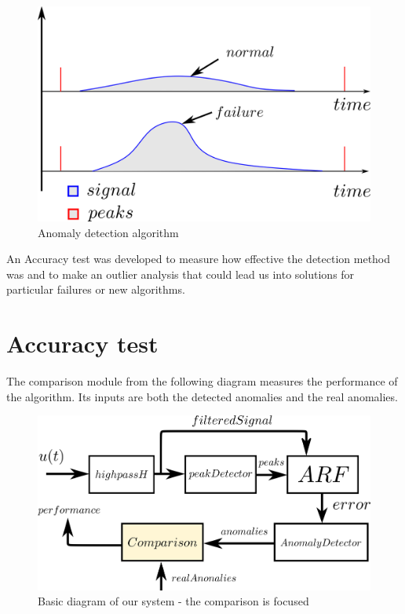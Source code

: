\documentclass[conference]{IEEEtran}
\begin{document}
\begin{figure}[H]
\centerline{\includegraphics[scale=0.7]{imagenes/anomalyAlgo}}
\caption{Anomaly detection algorithm}
\label{fig}
\end{figure}

An Accuracy test was developed  to measure how effective the detection method was and to make an outlier analysis that could lead us into solutions for particular failures or new algorithms.

\section{Accuracy test}
The comparison module from the following diagram measures the performance of the algorithm. Its inputs are both the detected anomalies and the real anomalies.\par

\begin{figure}[H]
\centerline{\includegraphics[scale=0.55]{imagenes/diagram2}}
\caption{Basic diagram of our system - the comparison is focused}
\label{fig}
\end{figure}
\end{document}
